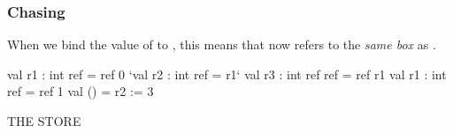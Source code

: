 \documentclass[aspectratio=169]{beamer}
\newcommand{\topthing}[2]{
      \begin{minipage}[t][#1][t]{\textwidth}
        \vspace{\fill}
        #2
        \vspace{\fill}
      \end{minipage}
    }
\begin{document}
\begin{frame}[fragile]
  \frametitle{ Chasing}

  \topthing{0.2in}{
    When we bind the value of  to \code{r2}, this means that \code{r2}
    now refers to the \textit{same box} as \code{r1}.
  }

  \vspace{10pt}

  \begin{center}
    \begin{minipage}[t][2.1in][t]{0.6\textwidth}
      \vspace{\fill}
      \begin{codeblock}
        val r1 : int ref     = ref 0
        `val r2 : int ref     = r1`
        val r3 : int ref ref = ref r1
        val r1 : int ref     = ref 1
        val ()               = r2 := 3
      \end{codeblock}
      \vspace{\fill}
    \end{minipage}
    \hfill\vline\hfill
    \begin{minipage}[t][2.1in][t]{0.3\textwidth}
      \centering
      {\hspace{-20pt}\color{gray} \large THE STORE}

      \vspace{\fill}
      \vspace{\fill}
    \end{minipage}
  \end{center}
\end{frame}
\end{document}
